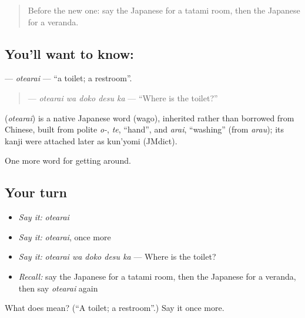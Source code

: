 \label{lesson:JA-C400-otearai}



\begin{quote}
Before the new one: say the Japanese for a tatami room, then the Japanese for a veranda.
\end{quote}

\subsection*{You'll want to know: }
\textbf{} — \emph{otearai} — \textquotedblleft{}a toilet; a restroom\textquotedblright{}.

\begin{quote}
\textbf{ } — \emph{otearai wa doko desu ka} — \textquotedblleft{}Where is the toilet?\textquotedblright{}
\end{quote}

\begin{cousinweb}
\textbf{} (\emph{otearai}) is a native Japanese word (wago), inherited rather than borrowed from Chinese, built from polite \emph{o-}, \emph{te}, \textquotedblleft{}hand\textquotedblright{}, and \emph{arai}, \textquotedblleft{}washing\textquotedblright{} (from \emph{arau}); its kanji were attached later as kun'yomi (JMdict).
\end{cousinweb}

\begin{grammarlens}[title={What you've built}]
One more word for getting around.
\end{grammarlens}

\subsection*{Your turn}
\begin{itemize}
\raggedright
  \item \emph{Say it:} \emph{otearai}
  \item \emph{Say it:} \emph{otearai}, once more
  \item \emph{Say it:} \emph{otearai wa doko desu ka} — Where is the toilet?
  \item \emph{Recall:} say the Japanese for a tatami room, then the Japanese for a veranda, then say \emph{otearai} again
\end{itemize}

\begin{tcolorbox}[breakable,colback=teal!4,colframe=teal!35!black,title={Before you move on}]
What does  mean? (\textquotedblleft{}A toilet; a restroom\textquotedblright{}.) Say it once more.
\end{tcolorbox}
